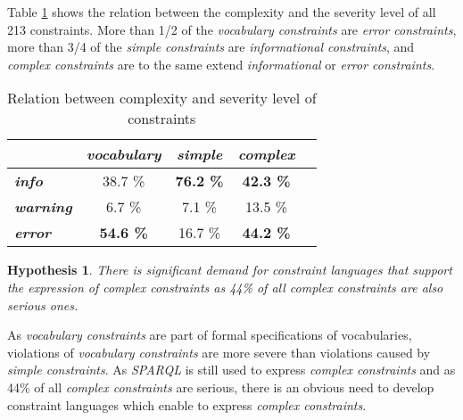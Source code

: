 \documentclass{llncs}
\newtheorem{hyp}{Hypothesis}
\begin{document}
Table \ref{tab:evaluation-complexity-severity} shows the relation between the complexity and the severity level of all 213 constraints.
More than 1/2 of the \emph{vocabulary constraints} are \emph{error constraints},
more than 3/4 of the \emph{simple constraints} are \emph{informational constraints}, and
\emph{complex constraints} are to the same extend \emph{informational} or \emph{error constraints}. 

\begin{table}[H]
		\scriptsize
    \begin{center}
    \begin{tabular}{@{}lcccc@{}}
    \\       \textbf{}
           & \textbf{\emph{vocabulary}}
           & \textbf{\emph{simple}}
					 & \textbf{\emph{complex}}
    \\ \midrule
		\textbf{\emph{info}} & 38.7 \% & \textbf{76.2 \%} & \textbf{42.3 \%} \\
		\textbf{\emph{warning}} & 6.7 \% & 7.1 \% & 13.5 \% \\
		\textbf{\emph{error}} & \textbf{54.6 \%} & 16.7 \% & \textbf{44.2 \%} \\
    \bottomrule
    \end{tabular}
    \caption{Relation between complexity and severity level of constraints}
		\label{tab:evaluation-complexity-severity}
    \end{center}
\end{table}

\begin{hyp}
There is significant demand for constraint languages that support the expression of complex constraints as 44\% of all complex constraints are also serious ones.
\end{hyp}

As \emph{vocabulary constraints} are part of formal specifications of vocabularies,
violations of \emph{vocabulary constraints} are more severe than violations caused by \emph{simple constraints}.
As \emph{SPARQL} is still used to express \emph{complex constraints} and as 44\% of all \emph{complex constraints} are serious,
there is an obvious need to develop constraint languages which enable to express \emph{complex constraints}.
\end{document}
